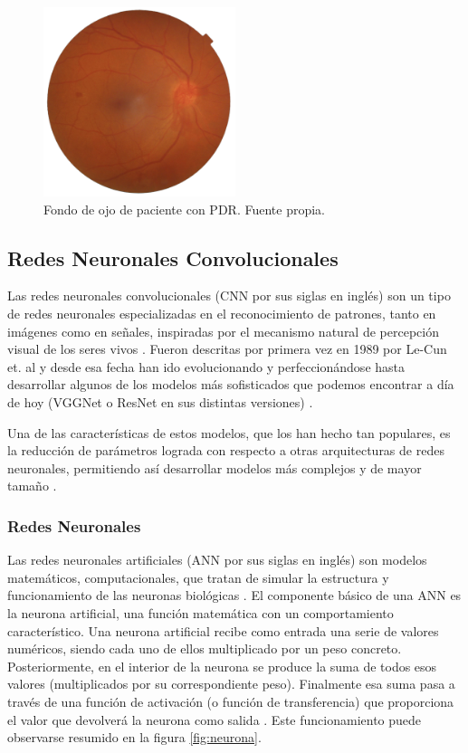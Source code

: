 \begin{itemize}[itemsep=0.25em]
    \begin{figure}[h]
        \centering
        \includegraphics[width=0.5\textwidth]{img/G4.png}
        \caption{Fondo de ojo de paciente con PDR. Fuente propia.}
        \label{fig:G4}
    \end{figure}
    
\end{itemize}

\subsection{Redes Neuronales Convolucionales}

Las redes neuronales convolucionales (CNN por sus siglas en inglés) son un tipo de redes neuronales especializadas en el reconocimiento de patrones, tanto en imágenes como en señales, inspiradas por el mecanismo natural de percepción visual de los seres vivos \cite{cnn:gu, cnn:ieee}. Fueron descritas por primera vez en 1989 por Le-Cun et. al \cite{cnn:antecesor} y desde esa fecha han ido evolucionando y perfeccionándose hasta desarrollar algunos de los modelos más sofisticados que podemos encontrar a día de hoy (VGGNet o ResNet en sus distintas versiones) \cite{cnn:gu}. 

Una de las características de estos modelos, que los han hecho tan populares, es la reducción de parámetros lograda con respecto a otras arquitecturas de redes neuronales, permitiendo así desarrollar modelos más complejos y de mayor tamaño \cite{cnn:ieee}.

\subsubsection{Redes Neuronales}

Las redes neuronales artificiales (ANN por sus siglas en inglés) son modelos matemáticos, computacionales, que tratan de simular la estructura y funcionamiento de las neuronas biológicas \cite{cnn:osea}. El componente básico de una ANN es la neurona artificial, una función matemática con un comportamiento característico. Una neurona artificial recibe como entrada una serie de valores numéricos, siendo cada uno de ellos multiplicado por un peso concreto. Posteriormente, en el interior de la neurona se produce la suma de todos esos valores (multiplicados por su correspondiente peso). Finalmente esa suma pasa a través de una función de activación (o función de transferencia) que proporciona el valor que devolverá la neurona como salida \cite{ann:intro}. Este funcionamiento puede observarse resumido en la figura \ref{fig:neurona}.

